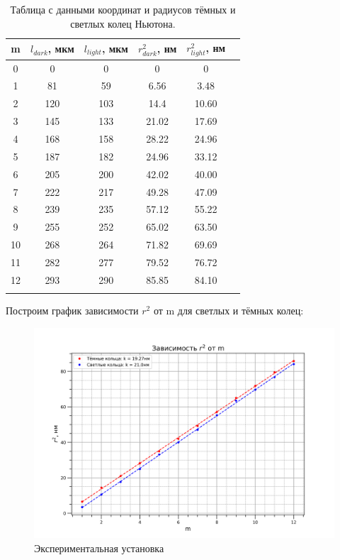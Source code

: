 \documentclass[a4paper, 12pt]{article}%
\begin{document}
\begin{longtable}{|c|c|c|c|c|c|}
			\hline
			m      & $l_{dark}$, мкм & $l_{light}$, мкм & $r_{dark}^2$, нм & $r_{light}^2$, нм 					 \\ \hline
			0 	   & 0             & 0              & 0                       & 0 						     \\ \hline
			1      & 81            & 59            	& 6.56                    & 3.48 				     \\ \hline
			2      & 120           & 103            & 14.4                    & 10.60 					 \\ \hline
			3      & 145           & 133            & 21.02                   & 17.69                    \\ \hline
			4      & 168           & 158            & 28.22                   & 24.96                     \\ \hline
			5      & 187           & 182            & 24.96                   & 33.12                    \\ \hline
			6      & 205           & 200            & 42.02                   & 40.00                   \\ \hline
			7      & 222           & 217            & 49.28                   & 47.09                       \\ \hline
			8      & 239           & 235            & 57.12                   & 55.22                     \\ \hline
			9      & 255           & 252           	& 65.02                   & 63.50                      \\ \hline
			10     & 268    	   & 264         	& 71.82                   & 69.69                      \\ \hline
			11     & 282           & 277           	& 79.52                   & 76.72                   \\ \hline
			12     & 293           & 290           	& 85.85                   & 84.10                     \\ \hline
\caption{Таблица с данными координат и радиусов тёмных и светлых колец Ньютона.}
\end{longtable}

Построим график зависимости $r^2$ от m для светлых и тёмных колец:

\begin{figure}[H]
	\begin{center}
		\includegraphics[width=0.6\linewidth]{r(m).png}
		\caption{Экспериментальная установка}
	\end{center}
\end{figure}
\end{document}
